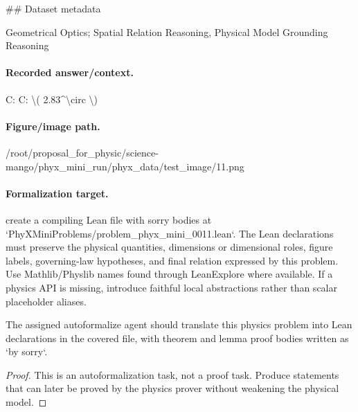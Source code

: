 \#\# Dataset metadata

Geometrical Optics; Spatial Relation Reasoning, Physical Model Grounding Reasoning

\paragraph{Recorded answer/context.}
C: C: \textbackslash{}( 2.83\textasciicircum{}\textbackslash{}circ \textbackslash{})

\paragraph{Figure/image path.}
/root/proposal\_for\_physic/science-mango/phyx\_mini\_run/phyx\_data/test\_image/11.png

\paragraph{Formalization target.}
create a compiling Lean file with sorry bodies at `PhyXMiniProblems/problem\_phyx\_mini\_0011.lean`. The Lean declarations must preserve the physical quantities, dimensions or dimensional roles, figure labels, governing-law hypotheses, and final relation expressed by this problem.
Use Mathlib/Physlib names found through LeanExplore where available. If a physics API is missing, introduce faithful local abstractions rather than scalar placeholder aliases.

\begin{theorem}
\label{thm:physics:phyx_mini_0011:target}
The assigned autoformalize agent should translate this physics problem into Lean declarations in the covered file, with theorem and lemma proof bodies written as `by sorry`.
\end{theorem}
\begin{proof}
This is an autoformalization task, not a proof task. Produce statements that can later be proved by the physics prover without weakening the physical model.
\end{proof}

